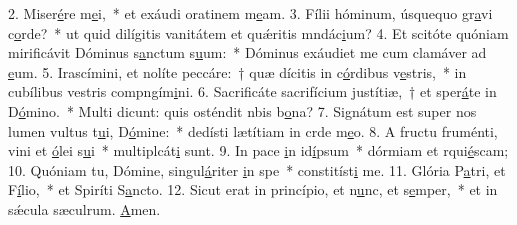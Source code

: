 2. Miser\uline{é}re m\uline{e}i,~* et exáudi oratinem m\uline{e}am.
3. Fílii hóminum, úsquequo gr\uline{a}vi c\uline{o}rde?~* ut quid dilígitis vanitátem et quǽritis mndác\uline{i}um?
4. Et scitóte quóniam mirificávit Dóminus s\uline{a}nctum s\uline{u}um:~* Dóminus exáudiet me cum clamáver ad \uline{e}um.
5. Irascímini, et nolíte peccáre:~† quæ dícitis in c\uline{ó}rdibus v\uline{e}stris,~* in cubílibus vestris compngím\uline{i}ni.
6. Sacrificáte sacrifícium justítiæ,~† et sper\uline{á}te in D\uline{ó}mino.~* Multi dicunt: quis osténdit nbis b\uline{o}na?
7. Signátum est super nos lumen vultus t\uline{u}i, D\uline{ó}mine:~* dedísti lætítiam in crde m\uline{e}o.
8. A fructu fruménti, vini et \uline{ó}lei s\uline{u}i~* multiplcát\uline{i} sunt.
9. In pace \uline{i}n id\uline{í}psum~* dórmiam et rqui\uline{é}scam;
10. Quóniam tu, Dómine, singul\uline{á}riter \uline{i}n spe~* constitíst\uline{i} me.
11. Glória P\uline{a}tri, et F\uline{í}lio,~* et Spiríti S\uline{a}ncto.
12. Sicut erat in princípio, et n\uline{u}nc, et s\uline{e}mper,~* et in sǽcula sæculrum. \uline{A}men.
